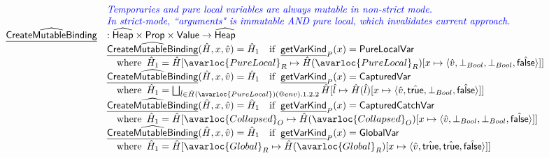 \[\begin{array}{ll}
& {\inblue \textit{Temporaries and pure local variables are always mutable in non-strict mode.}} \\
& {\inblue \textit{In strict-mode, ``arguments" is immutable AND pure local, which invalidates current approach.}} \\
\ahf{CreateMutableBinding} & : \aHeap \times \SF{Prop} \times \SF{Value} \rightarrow \aHeap \\
& \ahf{CreateMutableBinding}(\hat{H}, x, \hat{v}) = \hat{H}_1 \quad\ifc{\chf{getVarKind}_P(x) = \SF{PureLocalVar}} \\
& \quad\wherec{\hat{H}_1 = \hat{H}[\avarloc{PureLocal}_R \mapsto \hat{H}(\avarloc{PureLocal}_R)
    [x \mapsto \langle \hat{v},\bot_{Bool},\bot_{Bool},\afalse \rangle]]} \\
& \ahf{CreateMutableBinding}(\hat{H}, x, \hat{v}) = \hat{H}_1 \quad\ifc{\chf{getVarKind}_P(x) = \SF{CapturedVar}} \\
& \quad\wherec{\hat{H}_1 = \bigsqcup_{\hat{l}\in\hat{H}(\avarloc{PureLocal})(\varprop{env}).1.2.2} \hat{H}[\hat{l} \mapsto \hat{H}(\hat{l})
    [x \mapsto \langle \hat{v},\atrue,\bot_{Bool},\afalse \rangle]]} \\
& \ahf{CreateMutableBinding}(\hat{H}, x, \hat{v}) = \hat{H}_1 \quad\ifc{\chf{getVarKind}_P(x) = \SF{CapturedCatchVar}} \\
& \quad\wherec{\hat{H}_1 = \hat{H}[\avarloc{Collapsed}_O \mapsto \hat{H}(\avarloc{Collapsed}_O)
    [x \mapsto \langle \hat{v},\bot_{Bool},\bot_{Bool},\afalse \rangle]]} \\
& \ahf{CreateMutableBinding}(\hat{H}, x, \hat{v}) = \hat{H}_1 \quad\ifc{\chf{getVarKind}_P(x) = \SF{GlobalVar}} \\
& \quad\wherec{\hat{H}_1 = \hat{H}[\avarloc{Global}_R \mapsto \hat{H}(\avarloc{Global}_R)
    [x \mapsto \langle \hat{v},\atrue,\atrue,\afalse \rangle]]} \\
\\


\end{array}\]

